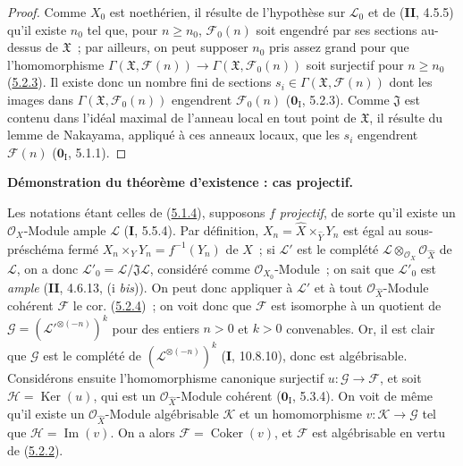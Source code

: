 \begin{proof}
Comme $X_0$ est noethérien, il résulte de l'hypothèse sur $\mathcal L_0$ et de
(\textbf{II}, 4.5.5) qu'il existe $n_0$ tel que, pour $n\geq n_0$, $\mathcal F_0(n)$ soit
engendré par ses sections au-dessus de $\mathfrak X$~; par ailleurs, on peut supposer
$n_0$ pris assez grand pour que l'homomorphisme
$\Gamma(\mathfrak X,\mathcal F(n))\longrightarrow
\Gamma(\mathfrak X,\mathcal F_0(n))$
soit surjectif pour $n\geq n_0$ (\hyperref[III.5.2.3-fr]{5.2.3}). Il existe donc
un nombre fini de sections $s_i\in\Gamma(\mathfrak X,\mathcal F(n))$ dont les
images dans $\Gamma(\mathfrak X,\mathcal F_0(n))$ engendrent $\mathcal F_0(n)$
($\mathbf{0}_{\mathrm I}$, 5.2.3). Comme $\mathfrak J$ est contenu dans l'idéal maximal de
l'anneau local en tout point de $\mathfrak X$, il résulte du lemme de Nakayama,
appliqué à ces anneaux locaux, que les $s_i$ engendrent $\mathcal F(n)$
($\mathbf{0}_{\mathrm I}$, 5.1.1).
\end{proof}

\begin{env}[5.2.5]
\label{III.5.2.5-fr}
\textbf{Démonstration du théorème d'existence : cas projectif.}

Les notations étant celles de (\hyperref[III.5.1.4-fr]{5.1.4}), supposons $f$
\emph{projectif}, de sorte qu'il existe un $\mathcal O_X$-Module ample $\mathcal L$
(\textbf{I}, 5.5.4). Par définition, $X_n=\widehat X\times_{\widehat Y}Y_n$ est égal au
sous-préschéma fermé $X_n\times_Y Y_n=f^{-1}(Y_n)$ de $X$~; si
$\mathcal L'$ est le
complété $\mathcal L\otimes_{\mathcal O_X}\mathcal O_{\widehat X}$ de $\mathcal L$, on a donc
$\mathcal L'_0=\mathcal L/\mathfrak J\mathcal L$, considéré comme
$\mathcal O_{X_0}$-Module~; on sait que $\mathcal L'_0$ est \emph{ample}
(\textbf{II}, 4.6.13, (i \emph{bis})). On peut donc appliquer à $\mathcal L'$ et à tout
$\mathcal O_{\widehat X}$-Module cohérent $\mathcal F$ le cor.
(\hyperref[III.5.2.4-fr]{5.2.4})~; on voit donc que $\mathcal F$ est isomorphe à
un quotient de
$\mathcal G=(\mathcal L'^{\otimes(-n)})^k$
pour des entiers $n>0$ et $k>0$ convenables. Or, il est clair que $\mathcal G$ est
le complété de $(\mathcal L^{\otimes(-n)})^k$ (\textbf{I}, 10.8.10), donc est
algébrisable. Considérons ensuite l'homomorphisme canonique surjectif
$u:\mathcal G\to\mathcal F$, et soit $\mathcal H=\operatorname{Ker}(u)$, qui est
un $\mathcal O_{\widehat X}$-Module cohérent ($\mathbf{0}_{\mathrm I}$, 5.3.4). On voit de
même qu'il existe un $\mathcal O_{\widehat X}$-Module algébrisable $\mathcal K$ et
un homomorphisme $v:\mathcal K\to\mathcal G$ tel que
$\mathcal H=\operatorname{Im}(v)$. On a alors
$\mathcal F=\operatorname{Coker}(v)$, et $\mathcal F$ est algébrisable en vertu de
(\hyperref[III.5.2.2-fr]{5.2.2}).
\end{env}

